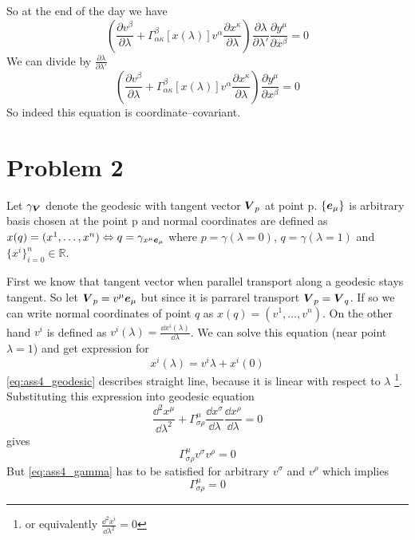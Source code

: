 %
So at the end of the day we have
%
\begin{equation}
    \left(\frac{\partial v^\beta}{\partial\lambda} +
    \Gamma_{\alpha\kappa}^\beta\left[x(\lambda)\right]v^\alpha
    \frac{\partial x^\kappa}{\partial \lambda}\right)
    \frac{\partial \lambda}{\partial \lambda'}
    \frac{\partial y^\mu}{\partial x^\beta} = 0
\end{equation}
%
We can divide by $\frac{\partial \lambda}{\partial \lambda'}$
%
\begin{equation}
    \boxed{\left(\frac{\partial v^\beta}{\partial\lambda} +
        \Gamma_{\alpha\kappa}^\beta\left[x(\lambda)\right]v^\alpha
        \frac{\partial x^\kappa}{\partial \lambda}\right)
        \frac{\partial y^\mu}{\partial x^\beta} = 0}
\end{equation}
%
So indeed this equation is coordinate--covariant.

\section*{Problem 2}

Let $\gamma_{\boldsymbol{V}}$ denote the geodesic with tangent vector $\boldsymbol{V}_p$ at
point p. $\{\boldsymbol{e}_\mu\}$ is arbitrary basis chosen at the point p and normal
coordinates are defined as $x(q)=(x^1,\dots,x^n) \Leftrightarrow q=\gamma_{x^\mu
        \boldsymbol{e}_\mu}$ where $p=\gamma(\lambda=0)$, $q=\gamma(\lambda=1)$ and $\{x^i\}_{i=0}^n \in \mathbb{R}$.

First we know that tangent vector when parallel transport along a geodesic stays
tangent. So let $\boldsymbol{V}_p=v^\mu \boldsymbol{e}_\mu$ but since it is parrarel transport
$\boldsymbol{V}_p=\boldsymbol{V}_q$. If so we can write normal coordinates of point $q$ as
$x(q)=(v^1,\dots,v^n)$. On the other hand $v^i$ is defined as
$v^i(\lambda)=\frac{\dd x^i(\lambda)}{\dd \lambda}$. We can solve this equation
(near point $\lambda=1$) and get expression for
%
\begin{equation}
    x^i(\lambda) = v^i \lambda + x^i(0)
    \label{eq:ass4_geodesic}
\end{equation}
%
\autoref{eq:ass4_geodesic} describes straight line, because it is linear with
respect to $\lambda$ \footnote{or equivalently $\frac{\dd^2 x^i}{\dd
            \lambda^2}=0$}.
%
Substituting this expression into geodesic equation
%
\begin{equation}
    \frac{\dd^2 x^\mu}{\dd \lambda^2} + \Gamma_{\sigma\rho}^\mu\frac{\dd x^\sigma}{\dd \lambda}\frac{\dd x^\rho}{\dd \lambda} = 0
\end{equation}
%
gives
%
\begin{equation}
    \Gamma_{\sigma\rho}^\mu v^\sigma v^\rho = 0
    \label{eq:ass4_gamma}
\end{equation}
%
But \autoref{eq:ass4_gamma} has to be satisfied for arbitrary $v^\sigma$ and
$v^\rho$ which implies
%
\begin{equation}
    \boxed{\Gamma_{\sigma\rho}^\mu = 0}
\end{equation}
%
